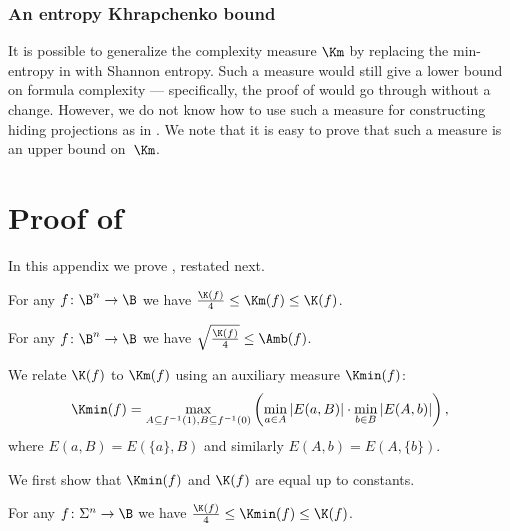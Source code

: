 \documentclass{toc}
\begin{document}
%
%
\subsubsection{An entropy Khrapchenko bound}  %

It is possible to generalize the complexity measure $\Km$ by replacing
the min-entropy in  
with Shannon entropy.
Such a measure would still %
give a lower bound on %
formula complexity --- specifically,
the proof of  
would go through
without a change. However, we do not know how to use such a measure
for constructing hiding projections as in 
.
We note that it is easy to prove that such a measure is an upper bound
on~$\Km$.

\section{\label{sec:K-Km}Proof of 
  }

In this appendix we prove 
  , restated next. 
\begin{restated}{}
For any $f\colon\B^{n}\to\B$ we have $\tfrac{\K(f)}{4}\le\Km(f)\le\K(f)$. 
\end{restated}

\begin{restated}{}
For any $f\colon\B^{n}\to\B$ we have $\sqrt{\tfrac{\K(f)}{4}}\le\Amb(f)$. 
\end{restated}

We relate $\K(f)$ to $\Km(f)$ using an auxiliary measure $\Kmin(f)$:
\[
\Kmin(f)=\max_{A\subseteq f^{-1}(1),B\subseteq f^{-1}(0)}\left(\min_{a\in A}{|E(a,B)|}\cdot\min_{b\in B}{|E(A,b)|}\right),
\]
where $E(a,B)=E(\{a\},B)$ and similarly $E(A,b)=E(A,\{b\})$.

We first show that $\Kmin(f)$ and $\K(f)$ are equal up to constants.
\begin{claim}
\label{claim:K-Kmin} For any $f\colon\Sigma^{n}\to\B$ we have $\tfrac{\K(f)}{4}\le\Kmin(f)\le\K(f)$. 
\end{claim}
\end{document}
